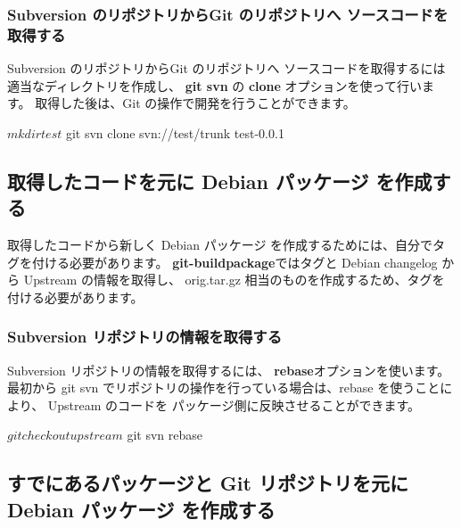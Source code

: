 \documentclass[mingoth,a4paper]{jsarticle}
\begin{document}
\subsubsection{Subversion のリポジトリからGit のリポジトリへ ソースコードを取得する}
Subversion のリポジトリからGit のリポジトリへ ソースコードを取得するには
適当なディレクトリを作成し、 {\bf git svn} の {\bf clone} オプションを使って行います。
取得した後は、Git の操作で開発を行うことができます。

\begin{commandline}
$ mkdir test
$ git svn clone svn://test/trunk test-0.0.1
\end{commandline}

\subsection{取得したコードを元に Debian パッケージ を作成する}
取得したコードから新しく Debian パッケージ を作成するためには、自分でタグを付ける必要があります。
{\bf git-buildpackage}ではタグと Debian changelog から Upstream の情報を取得し、
orig.tar.gz 相当のものを作成するため、タグを付ける必要があります。



\subsubsection{Subversion リポジトリの情報を取得する}
Subversion リポジトリの情報を取得するには、 {\bf rebase}オプションを使います。
最初から git svn でリポジトリの操作を行っている場合は、rebase を使うことにより、
Upstream のコードを パッケージ側に反映させることができます。
\begin{commandline}
$ git checkout upstream
$ git svn rebase
\end{commandline}

\subsection{すでにあるパッケージと Git リポジトリを元に Debian パッケージ を作成する}
\end{document}
